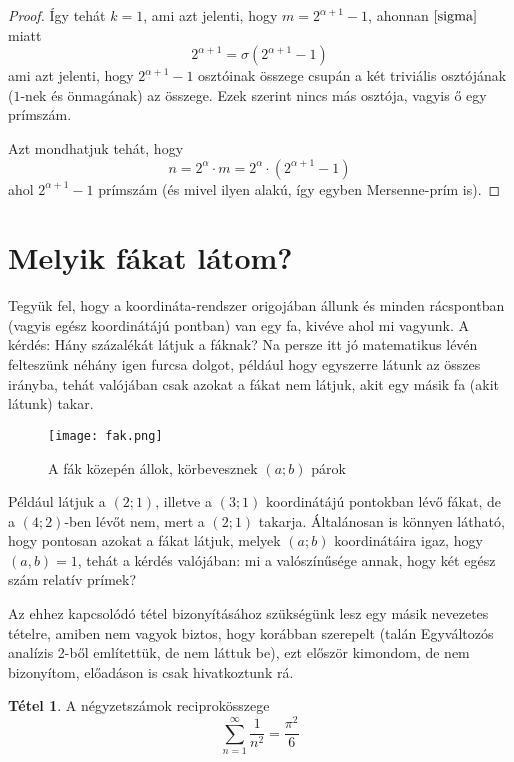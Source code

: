 \documentclass[12pt]{book}
\theoremstyle{plain} %
\theoremstyle{definition} %
\newtheorem{theo/}{Tétel}[section]
\newenvironment{theo}
  {\renewcommand{\qedsymbol}{$\clubsuit$}%
   \pushQED{\qed}\begin{theo/}}
  {\popQED\end{theo/}}
\theoremstyle{remark}
\renewcommand\qedsymbol{$\blacksquare$}
\numberwithin{equation}{section}  %
\begin{document}
\begin{proof}
		Így tehát $k=1$, ami azt jelenti, hogy $m=2^{\alpha+1}-1$, ahonnan $\ref{sigma}$ miatt
		\[ 2^{\alpha+1} = \sigma(2^{\alpha+1}-1)  \]
		ami azt jelenti, hogy $2^{\alpha+1}-1$ osztóinak összege csupán a két triviális osztójának ($1$-nek és önmagának) az összege. Ezek szerint nincs más osztója, vagyis ő egy prímszám.
		
		Azt mondhatjuk tehát, hogy
		\[ n = 2^{\alpha} \cdot m = 2^{\alpha} \cdot (2^{\alpha+1} - 1)  \]
		ahol $2^{\alpha+1}-1$ prímszám (és mivel ilyen alakú, így egyben Mersenne-prím is).	
	\end{proof}
	
	
	\section{Melyik fákat látom?}
	
	Tegyük fel, hogy a koordináta-rendszer origojában állunk és minden rácspontban (vagyis egész koordinátájú pontban) van egy fa, kivéve ahol mi vagyunk. A kérdés: Hány százalékát látjuk a fáknak? Na persze itt jó matematikus lévén felteszünk néhány igen furcsa dolgot, például hogy egyszerre látunk az összes irányba, tehát valójában csak azokat a fákat nem látjuk, akit egy másik fa (akit látunk) takar.
	
	\begin{figure}[h] %
		\centering
		\texttt{[image: fak.png]}
		\caption{A fák közepén állok, körbevesznek $(a;b)$ párok}\label{fak}
	\end{figure}

	Például látjuk a $(2;1)$, illetve a $(3;1)$ koordinátájú pontokban lévő fákat, de a $(4;2)$-ben lévőt nem, mert a $(2;1)$ takarja. Általánosan is könnyen látható, hogy pontosan azokat a fákat látjuk, melyek $(a;b)$ koordinátáira igaz, hogy $(a,b)=1$, tehát a kérdés valójában: mi a valószínűsége annak, hogy két egész szám relatív prímek?
	
	Az ehhez kapcsolódó tétel bizonyításához szükségünk lesz egy másik nevezetes tételre, amiben nem vagyok biztos, hogy korábban szerepelt (talán Egyváltozós analízis 2-ből említettük, de nem láttuk be), ezt először kimondom, de nem bizonyítom, előadáson is csak hivatkoztunk rá.
	
	\begin{theo}
		A négyzetszámok reciprokösszege
		\[ \sum\limits_{n = 1}^{\infty} \dfrac{1}{n^2} =   \dfrac{\pi^2}{6} \]
	\end{theo}
\end{document}
